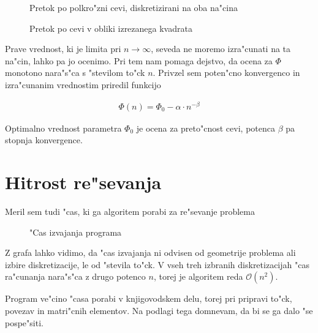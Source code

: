 \documentclass[a4paper,10pt]{article}
\begin{document}
\begin{figure}[H]
 
 \caption{Pretok po polkro"zni cevi, diskretizirani na oba na"cina}
 \label{fig:pretok-polkrog}
\end{figure}

\begin{figure}[H]
 
 \caption{Pretok po cevi v obliki izrezanega kvadrata}
 \label{fig:pretok-kvadrat}
\end{figure}

Prave vrednost, ki je limita pri $n\to\infty$, seveda ne moremo izra"cunati na ta na"cin, lahko pa jo ocenimo. Pri tem nam pomaga dejstvo, da ocena za $\Phi$ monotono nara"s"ca s "stevilom to"ck $n$. Privzel sem poten"cno konvergenco in izra"cunanim vrednostim priredil funkcijo

\begin{align}
 \Phi(n) = \Phi_0 - \alpha \cdot n^{-\beta}
\end{align}

Optimalno vrednost parametra $\Phi_0$ je ocena za preto"cnost cevi, potenca $\beta$ pa stopnja konvergence. 

\section{Hitrost re"sevanja}

Meril sem tudi "cas, ki ga algoritem porabi za re"sevanje problema

\begin{figure}[H]
 
 \caption{"Cas izvajanja programa}
 \label{fig:hitrost}
\end{figure}

Z grafa lahko vidimo, da "cas izvajanja ni odvisen od geometrije problema ali izbire diskretizacije, le od "stevila to"ck. V vseh treh izbranih diskretizacijah "cas ra"cunanja nara"s"ca z drugo potenco $n$, torej je algoritem reda $\mathcal{O}(n^2)$. 

Program ve"cino "casa porabi v knjigovodskem delu, torej pri pripravi to"ck, povezav in matri"cnih elementov. Na podlagi tega domnevam, da bi se ga dalo "se pospe"siti. 
\end{document}
